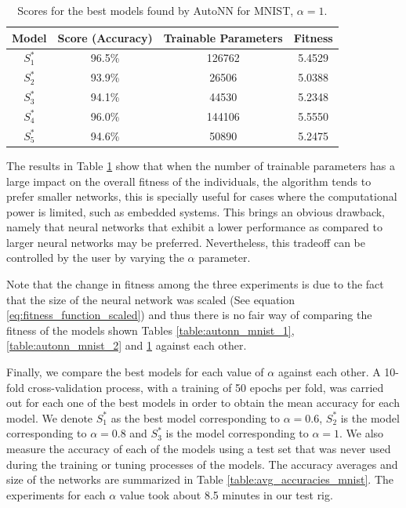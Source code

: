 \documentclass[journal]{IEEEtran}
\begin{document}
\begin{table}[!htb]
\begin{center}
\begin{tabular}{| c | c | c | c |}
\hline
Model & Score (Accuracy) & Trainable Parameters & Fitness\\
\hline
$S^*_1$ & 96.5\% & 126762 & 5.4529\\
$S^*_2$ & 93.9\% & 26506 & 5.0388\\
$S^*_3$ & 94.1\% & 44530 & 5.2348\\
$S^*_4$ & 96.0\% & 144106 & 5.5550\\
$S^*_5$ & 94.6\% & 50890 & 5.2475\\
\hline
\end{tabular}
\end{center}
\caption{Scores for the best models found by AutoNN for MNIST, $\alpha = 1$.}
\label{table:autonn_mnist_3}
\end{table}


The results in Table \ref{table:autonn_mnist_3} show that when the number of trainable parameters has a large impact on the overall fitness of the individuals, the algorithm tends to prefer smaller networks, this is specially useful for cases where the computational power is limited, such as embedded systems. This brings an obvious drawback, namely that neural networks that exhibit a lower performance as compared to larger neural networks may be preferred. Nevertheless, this tradeoff can be controlled by the user by varying the $\alpha$ parameter. 

Note that the change in fitness among the three experiments is due to the fact that the size of the neural network was scaled (See equation \ref{eq:fitness_function_scaled}) and thus there is no fair way of comparing the fitness of the models shown Tables \ref{table:autonn_mnist_1}, \ref{table:autonn_mnist_2} and \ref{table:autonn_mnist_3} against each other.

Finally, we compare the best models for each value of $\alpha$ against each other. A 10-fold cross-validation process, with a training of 50 epochs per fold, was carried out for each one of the best models in order to obtain the mean accuracy for each model. We denote $ S^*_1$ as the best model corresponding to $\alpha = 0.6$, $S^*_2$ is the model corresponding to $\alpha = 0.8$ and $S^*_3$ is the model corresponding to $\alpha = 1$. We also measure the accuracy of each of the models using a test set that was never used during the training or tuning processes of the models. The accuracy averages and size of the networks are summarized in Table \ref{table:avg_accuracies_mnist}. The experiments for each $\alpha$ value took about 8.5 minutes in our test rig.
\end{document}
